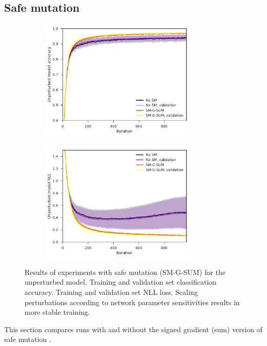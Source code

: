 \subsection{Safe mutation}
\begin{figure}[tbp!]
    \begin{subfigure}[b]{0.49\textwidth}
        \centering
        \includegraphics[height=5.8cm]{graphics/E021-SM-analysis/accuracy_unp-all-series-mean-sd.pdf}
        \caption{}
        \label{fig: Theory: E021-SM-analysis/accuracy_unp-all-series-mean-sd}
    \end{subfigure}
    \hfill
    \begin{subfigure}[b]{0.49\textwidth}
        \centering
        \includegraphics[height=5.8cm]{graphics/E021-SM-analysis/return_unp-all-series-mean-sd.pdf}
        \caption{}
        \label{fig: Theory: E021-SM-analysis/return_unp-all-series-mean-sd}
    \end{subfigure}
    \caption{
        Results of experiments with safe mutation (SM-G-SUM) for the unperturbed model.
         Training and validation set classification accuracy.
         Training and validation set \gls{NLL} loss.
        Scaling perturbations according to network parameter sensitivities results in more stable training.
    }
    \label{fig: Theory: E021-SM-analysis}
\end{figure}
This section compares runs with and without the signed gradient (sum) version of safe mutation \cite{Lehman2017a}.

